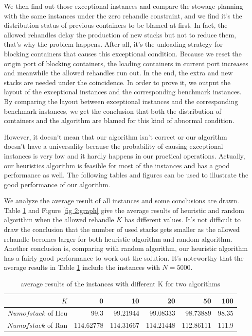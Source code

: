 \documentclass[review,3p,times,authoryear,12pt]{elsarticle}
\begin{document}
We then find out those exceptional instances and compare the stowage planning with the same instances under the zero rehandle constraint, and we find it's the distribution status of previous containers to be blamed at first.
In fact, the allowed rehandles delay the production of new stacks but not to reduce them, that's why the problem happens.
After all, it's the unloading strategy for blocking containers that causes this exceptional condition.
Because we reset the origin port of blocking containers, the loading containers in current port increases and meanwhile the allowed rehandles run out.
In the end, the extra and new stacks are needed under the coincidence.
In order to prove it, we output the layout of the exceptional instances and the corresponding benchmark instances.
By comparing the layout between exceptional instances and the corresponding benchmark instances, we get the conclusion that both the distribution of containers and the algorithm are blamed for this kind of abnormal condition.

However, it doesn't mean that our algorithm isn't correct or our algorithm doesn't have a universality because the probability of causing exceptional instances is very low and it hardly happens in our practical operations.
Actually, our heuristics algorithm is feasible for most of the instances and has a good performance as well.
The following tables and figures can be used to illustrate the good performance of our algorithm.

We analyze the average result of all instances and some conclusions are drawn.
Table \ref{tab:4} and Figure \ref{fig 2:graph} give the average results of heuristic and random algorithm when the allowed rehandle $K$ has different values.
It's not difficult to draw the conclusion that the number of used stacks gets smaller as the allowed rehandle becomes larger for both heuristic algorithm and random algorithm.
Another conclusion is, comparing with random algorithm, our heuristic algorithm has a fairly good performance to work out the solution.
It's noteworthy that the average results in Table \ref{tab:4} include the instances with $N=5000$.

\begin{table}[htbp]
  \centering
  \setlength{\belowcaptionskip}{10pt}
  \caption{average results of the instances with different K for two algorithms}
    \begin{tabular}{r|r|r|r|r|r}
    \hline
     $K$       &0   &10  &20  &50  &100\\
    \hline
    $Numofstack$ of Heu   &99.3  &99.21944  &99.08333   &98.73889  &98.35\\
 \hline
    $Numofstack$ of Ran  &114.62778  &114.31667  &114.21448  &112.86111 &111.9\\
 \hline
    \end{tabular}
  \label{tab:4}
\end{table}
\end{document}
